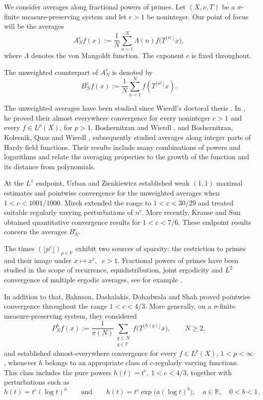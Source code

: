 \documentclass[10pt,leqno]{amsart}
\newcounter{counter}
\newcounter{counter2}
\numberwithin{equation}{section}
\numberwithin{counter2}{section}
\theoremstyle{definition}
\theoremstyle{plain}
\newcommand{\floor}[1]{\lfloor #1 \rfloor}
\begin{document}
	We consider averages along fractional powers of primes. Let
	$(X,\nu,T)$ be a $\sigma$-finite
	measure-preserving system and let $c>1$ be noninteger. Our point of focus will be the averages
	\[
	A_N^{c} f(x):=\frac1N\sum_{n=1}^N
	\Lambda(n)f\bigl(T^{\lfloor n^c\rfloor}x\bigr),
	\]
	where $\Lambda$ denotes the von Mangoldt function. The exponent
	$c$ is fixed throughout.
	
	The unweighted counterpart of $A_N^{c}$ is denoted by
	\[
	B_N^{c} f(x):=\frac1N\sum_{n=1}^N f(T^{\lfloor n^c\rfloor}x).
	\]

	The unweighted averages have been studied since Wierdl's
	doctoral thesis \cite{Wierdl1989Thesis}. In \cite[Theorem~4.3]{Wierdl1989Thesis}, he proved
	their almost everywhere convergence for every noninteger $c>1$
	and every $f\in L^p(X)$, for $p>1$. Boshernitzan and Wierdl
	\cite{BW1996}, and Boshernitzan, Kolesnik, Quas and Wierdl
	\cite{BKQW2005}, subsequently studied averages along integer parts
	of Hardy field functions. Their results include many combinations
	of powers and logarithms and relate the averaging properties to
	the growth of the function and its distance from polynomials.
	
	At the $L^1$ endpoint, Urban and Zienkiewicz \cite{UZ2007}
	established weak $(1,1)$ maximal estimates and pointwise
	convergence for the unweighted averages when $1<c<1001/1000$.
	Mirek \cite{Mirek2015Rough} extended the range to $1<c<30/29$
	and treated suitable regularly varying perturbations of $n^c$.
	More recently, Krause and Sun \cite{KrauseSun2025} obtained
	quantitative convergence results for $1<c<7/6$. These endpoint
	results concern the averages $B_N^{c}$.
	
    
    The times $\left( \floor{p^c} \right)_{p \in \mathbb{P}}$ exhibit two sources of sparsity: the restriction to primes and their image under $x \mapsto x^c, \; \; c>1.$  Fractional powers of primes have been studied in the scope of recurrence, equidistribution, joint ergodicity and $L^2$ convergence of multiple ergodic averages, see for example \cite{Bergelson2014,BKS2019,Frantzikinakis2022Joint,KoutsogiannisTsinas2026}.   
	
    In addition to that, Bahnson, Daskalakis, Dohadwala
and Shah \cite{BDDS24} proved pointwise convergence throughout
the range $1<c<4/3$. More generally, on a
$\sigma$-finite measure-preserving system, they considered
\[
P_N^h f(x):=\frac1{\pi(N)}
\sum_{\substack{q\le N\\q\in\mathbb{P}}}
f\bigl(T^{\lfloor h(q)\rfloor}x\bigr),
\qquad N\ge2,
\]
and established almost-everywhere convergence for every
$f\in L^p(X)$, $1<p<\infty$, whenever $h$ belongs to an
appropriate class of $c$-regularly varying functions.
This class includes the pure powers $h(t)=t^c, \ 1 < c < 4/3$, together with
perturbations such as
\[
h(t)=t^c(\log t)^a
\qquad\text{and}\qquad
h(t)=t^c\exp\bigl(a(\log t)^b\bigr),
\quad a\in\mathbb{R},\quad 0<b<1.
\]
	
\end{document}
